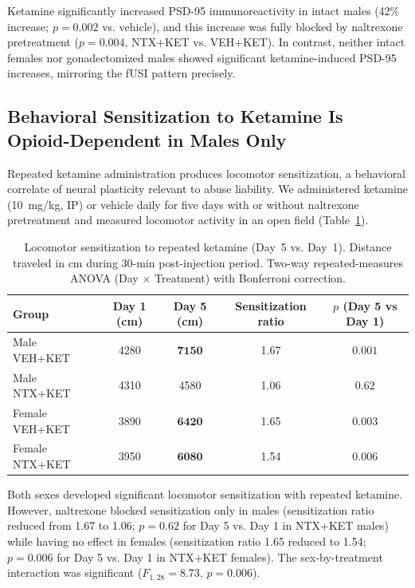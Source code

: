\documentclass[11pt]{article}
\begin{document}
Ketamine significantly increased PSD-95 immunoreactivity in intact males (42\% increase; $p = 0.002$ vs. vehicle), and this increase was fully blocked by naltrexone pretreatment ($p = 0.004$, NTX+KET vs. VEH+KET). In contrast, neither intact females nor gonadectomized males showed significant ketamine-induced PSD-95 increases, mirroring the fUSI pattern precisely.

\subsection{Behavioral Sensitization to Ketamine Is Opioid-Dependent in Males Only}

Repeated ketamine administration produces locomotor sensitization, a behavioral correlate of neural plasticity relevant to abuse liability. We administered ketamine (10~mg/kg, IP) or vehicle daily for five days with or without naltrexone pretreatment and measured locomotor activity in an open field (Table~\ref{tab:behavior}).

\begin{table}[H]
\centering
\caption{Locomotor sensitization to repeated ketamine (Day~5 vs. Day~1). Distance traveled in cm during 30-min post-injection period. Two-way repeated-measures ANOVA (Day $\times$ Treatment) with Bonferroni correction.}
\label{tab:behavior}
\begin{tabular}{lcccc}
\toprule
Group & Day 1 (cm) & Day 5 (cm) & Sensitization ratio & $p$ (Day 5 vs Day 1) \\
\midrule
Male VEH+KET & 4280 & $\mathbf{7150}$ & 1.67 & $0.001$ \\
Male NTX+KET & 4310 & 4580 & 1.06 & $0.62$ \\
Female VEH+KET & 3890 & $\mathbf{6420}$ & 1.65 & $0.003$ \\
Female NTX+KET & 3950 & $\mathbf{6080}$ & 1.54 & $0.006$ \\
\bottomrule
\end{tabular}
\end{table}

Both sexes developed significant locomotor sensitization with repeated ketamine. However, naltrexone blocked sensitization only in males (sensitization ratio reduced from 1.67 to 1.06; $p = 0.62$ for Day 5 vs. Day 1 in NTX+KET males) while having no effect in females (sensitization ratio 1.65 reduced to 1.54; $p = 0.006$ for Day 5 vs. Day 1 in NTX+KET females). The sex-by-treatment interaction was significant ($F_{1,28} = 8.73$, $p = 0.006$).
\end{document}
